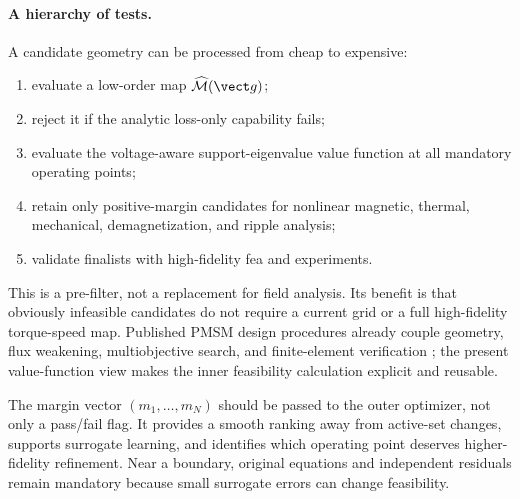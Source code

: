 \paragraph{A hierarchy of tests.}
A candidate geometry can be processed from cheap to expensive:
\begin{enumerate}
 \item evaluate a low-order map \(\widehat{\mathcal M}(\vect g)\);
 \item reject it if the analytic loss-only capability fails;
 \item evaluate the voltage-aware support-eigenvalue value function at all
       mandatory operating points;
 \item retain only positive-margin candidates for nonlinear magnetic,
       thermal, mechanical, demagnetization, and ripple analysis;
 \item validate finalists with high-fidelity \gls{fea} and experiments.
\end{enumerate}
This is a pre-filter, not a replacement for field analysis.  Its benefit is
that obviously infeasible candidates do not require a current grid or a full
high-fidelity torque-speed map.  Published PMSM design procedures already
couple geometry, flux weakening, multiobjective search, and finite-element
verification \cite{dang2017,parasiliti2012}; the present value-function view
makes the inner feasibility calculation explicit and reusable.

The margin vector \((m_1,\ldots,m_N)\) should be passed to the outer optimizer,
not only a pass/fail flag.  It provides a smooth ranking away from active-set
changes, supports surrogate learning, and identifies which operating point
deserves higher-fidelity refinement.  Near a boundary, original equations and
independent residuals remain mandatory because small surrogate errors can
change feasibility.

